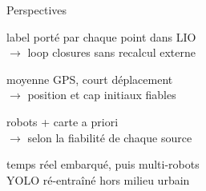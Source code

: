 \begin{frame}{Perspectives}
  \vfill
  \begin{tcbraster}[raster columns=2, raster equal height, raster column skip=0.4cm, raster row skip=0.3cm]
    \begin{tcolorbox}[carte, title=Sémantique intégrée à LIO]
      label porté par chaque point dans LIO\\
      $\rightarrow$ loop closures \alert{sans recalcul externe}
    \end{tcolorbox}
    \begin{tcolorbox}[carte, title=Initialisation des robots]
      moyenne GPS, court déplacement\\
      $\rightarrow$ \alert{position et cap} initiaux fiables
    \end{tcolorbox}
    \begin{tcolorbox}[carte, title=Fusion bayésienne]
      robots + carte a priori\\
      $\rightarrow$ selon la \alert{fiabilité} de chaque source
    \end{tcolorbox}
    \begin{tcolorbox}[carte, title=Tests en conditions réelles]
      \alert{temps réel} embarqué, puis multi-robots\\
      YOLO ré-entraîné hors milieu urbain
    \end{tcolorbox}
  \end{tcbraster}
  \vfill
\end{frame}

